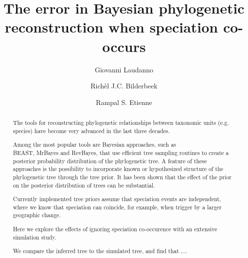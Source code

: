 \documentclass{article}
\title{The error in Bayesian phylogenetic reconstruction when speciation co-occurs}
\author[1]{Giovanni Laudanno}
\author[1]{Rich\`el J.C. Bilderbeek}
\author[1]{Rampal S. Etienne}
\affil[1]{Groningen Institute for Evolutionary Life Sciences, University of Groningen, Groningen, The Netherlands}
\begin{document}
\maketitle

\begin{abstract}



  The tools for reconstructing phylogenetic relationships between taxonomic 
  units (e.g. species) have become very advanced in the last three decades. 

  Among the most popular tools are Bayesian approaches, 
  such as \\ BEAST, MrBayes and RevBayes, 
  that use efficient tree sampling routines to create a posterior probability distribution 
  of the phylogenetic tree. 
  A feature of these approaches is the possibility to incorporate known 
  or hypothesized structure of the phylogenetic tree through the tree prior. 
  It has been shown that the effect of the prior on the posterior distribution 
  of trees can be substantial. 

  Currently implemented tree priors assume that speciation events are independent,
  where we know that speciation can coincide, for example, when trigger by a
  larger geographic change.

  Here we explore the effects of ignoring 
  speciation co-occurence with an extensive simulation study. 





  We compare the inferred tree to the simulated tree, and find that ....

\end{abstract}
\end{document}
